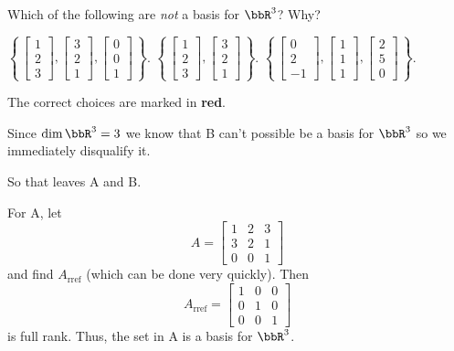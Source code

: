 \begin{questions}
  \question Which of the following are \emph{not} a basis for $\bbR^3$?
  Why?
  \begin{choices}
    \CorrectChoice%
    $\displaystyle\left\{\,
      \begin{bmatrix}1\\2\\3\end{bmatrix},
      \begin{bmatrix}3\\2\\1\end{bmatrix},
      \begin{bmatrix}0\\0\\1\end{bmatrix}%
      \,\right\}$.%
    \choice%
    $\displaystyle\left\{\,
      \begin{bmatrix}1\\2\\3\end{bmatrix},
      \begin{bmatrix}3\\2\\1\end{bmatrix}%
      \,\right\}$.%
    \CorrectChoice%
    $\displaystyle\left\{\,
      \begin{bmatrix}0\\2\\-1\end{bmatrix},
      \begin{bmatrix}1\\1\\1\end{bmatrix},
      \begin{bmatrix}2\\5\\0\end{bmatrix}%
      \,\right\}$.%
  \end{choices}
  \begin{solution}
    The correct choices are marked in {\color{Red!85!black}\textbf{red}}.

    Since $\dim\bbR^3=3$ we know that B can't possible be a basis for
    $\bbR^3$ so we immediately disqualify it.

    So that leaves A and B.

    For A, let
    \[
      A=\begin{bmatrix}%
        1&2&3\\
        3&2&1\\
        0&0&1
      \end{bmatrix}
    \]
    and find $A_{\text{rref}}$ (which can be done very quickly). Then
    \[
      A_{\text{rref}}=%
      \begin{bmatrix}%
        1&0&0\\
        0&1&0\\
        0&0&1
      \end{bmatrix}
    \]
    is full rank. Thus, the set in A is a basis for $\bbR^3$.


\end{solution}
\end{questions}
